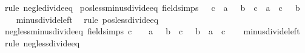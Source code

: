 \begin{isabellebody}
\ {\isacharparenleft}{\kern0pt}rule\ neg{\isacharunderscore}{\kern0pt}le{\isacharunderscore}{\kern0pt}divide{\isacharunderscore}{\kern0pt}eq{\isacharparenright}{\kern0pt}%
\endisatagproof
{\isafoldproof}%
%
\isadelimproof
\isanewline
%
\endisadelimproof
\isanewline
{}\isamarkupfalse%
\ pos{\isacharunderscore}{\kern0pt}less{\isacharunderscore}{\kern0pt}minus{\isacharunderscore}{\kern0pt}divide{\isacharunderscore}{\kern0pt}eq\ {\isacharbrackleft}{\kern0pt}field{\isacharunderscore}{\kern0pt}simps{\isacharbrackright}{\kern0pt}{\isacharcolon}{\kern0pt}\ {\isachardoublequoteopen}{}\ {\isacharless}{\kern0pt}\ c\ {\isasymLongrightarrow}\ a\ {\isacharless}{\kern0pt}\ {\isacharminus}{\kern0pt}\ {\isacharparenleft}{\kern0pt}b\ {\isacharslash}{\kern0pt}\ c{\isacharparenright}{\kern0pt}\ {\isasymlongleftrightarrow}\ a\ {\isacharasterisk}{\kern0pt}\ c\ {\isacharless}{\kern0pt}\ {\isacharminus}{\kern0pt}\ b{\isachardoublequoteclose}\isanewline
%
\isadelimproof
\ \ %
\endisadelimproof
%
\isatagproof
{}\isamarkupfalse%
\ minus{\isacharunderscore}{\kern0pt}divide{\isacharunderscore}{\kern0pt}left\ \isamarkupfalse%
\ {\isacharparenleft}{\kern0pt}rule\ pos{\isacharunderscore}{\kern0pt}less{\isacharunderscore}{\kern0pt}divide{\isacharunderscore}{\kern0pt}eq{\isacharparenright}{\kern0pt}%
\endisatagproof
{\isafoldproof}%
%
\isadelimproof
\isanewline
%
\endisadelimproof
\isanewline
{}\isamarkupfalse%
\ neg{\isacharunderscore}{\kern0pt}less{\isacharunderscore}{\kern0pt}minus{\isacharunderscore}{\kern0pt}divide{\isacharunderscore}{\kern0pt}eq\ {\isacharbrackleft}{\kern0pt}field{\isacharunderscore}{\kern0pt}simps{\isacharbrackright}{\kern0pt}{\isacharcolon}{\kern0pt}\ {\isachardoublequoteopen}c\ {\isacharless}{\kern0pt}\ {}\ {\isasymLongrightarrow}\ a\ {\isacharless}{\kern0pt}\ {\isacharminus}{\kern0pt}\ {\isacharparenleft}{\kern0pt}b\ {\isacharslash}{\kern0pt}\ c{\isacharparenright}{\kern0pt}\ {\isasymlongleftrightarrow}\ {\isacharminus}{\kern0pt}\ b\ {\isacharless}{\kern0pt}\ a\ {\isacharasterisk}{\kern0pt}\ c{\isachardoublequoteclose}\isanewline
%
\isadelimproof
\ \ %
\endisadelimproof
%
\isatagproof
{}\isamarkupfalse%
\ minus{\isacharunderscore}{\kern0pt}divide{\isacharunderscore}{\kern0pt}left\ \isamarkupfalse%
\ {\isacharparenleft}{\kern0pt}rule\ neg{\isacharunderscore}{\kern0pt}less{\isacharunderscore}{\kern0pt}divide{\isacharunderscore}{\kern0pt}eq{\isacharparenright}{\kern0pt}%
\endisatagproof
{\isafoldproof}%
%
\isadelimproof
\isanewline
%
\endisadelimproof

\end{isabellebody}
